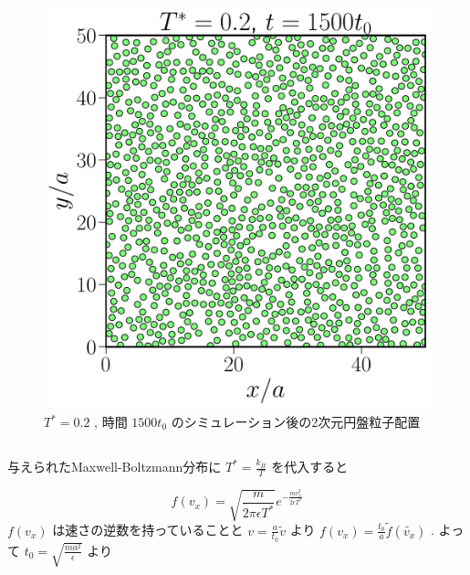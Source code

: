 \documentclass[a4paper,dvipdfmx]{jarticle}
\begin{document}
\begin{figure}[H]
    \centering
    \includegraphics[scale=0.6]{problem_2/2-3/problem2-3.pdf}
    \caption{$T^*=0.2$ , 時間 $1500t_0$ のシミュレーション後の2次元円盤粒子配置}
\end{figure}



\subsection{}
\noindent
与えられたMaxwell-Boltzmann分布に $T^*=\frac{k_B}{T}$ を代入すると

\begin{equation}
    f(v_x) = \sqrt{\frac{m}{2\pi \epsilon T^*}}e^{-\frac{mv_x^2}{2\epsilon T^*}} \tag{2.7}
\end{equation}
$f(v_x)$ は速さの逆数を持っていることと $v=\frac{a}{t_0}\tilde{v}$ より
$f(v_x)=\frac{t_0}{a} \tilde{f}(\tilde{v_x})$ . 
よって $t_0=\sqrt{\frac{ma^2}{\epsilon}}$ より
\end{document}
